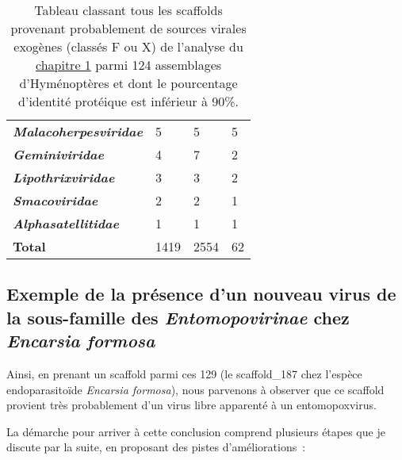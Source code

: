 \begin{table}[!htbp]
{\begin{tabular}{l|lll}
\textbf{\textit{Malacoherpesviridae}} & 5 & 5 & 5 \\
\textbf{\textit{Geminiviridae}} & 4 & 7 & 2 \\
\textbf{\textit{Lipothrixviridae}} & 3 & 3 & 2 \\
\textbf{\textit{Smacoviridae}} & 2 & 2 & 1 \\
\textbf{\textit{Alphasatellitidae}} & 1 & 1 & 1 \\
\textbf{Total} & 1419 & 2554 & 62 \\
\bottomrule
\end{tabular}
}
\caption[Perspective:Classification des scaffolds exogènes provenant du chapitre1]{Tableau classant tous les scaffolds provenant probablement de sources virales exogènes (classés F ou X) de l'analyse du \hyperref[sec:chap1]{chapitre 1} parmi 124 assemblages d'Hyménoptères et dont le pourcentage d'identité protéique est inférieur à 90\%.}
\label{table:Free-living_viruses}
\end{table}

\subsection{Exemple de la présence d'un nouveau virus de la sous-famille des \textit{Entomopovirinae} chez \textit{Encarsia formosa}}

Ainsi, en prenant un scaffold parmi ces 129 (le scaffold\_187 chez l'espèce endoparasitoïde \textit{Encarsia formosa}), nous parvenons à observer que ce scaffold provient très probablement d'un virus libre apparenté à un entomopoxvirus.

La démarche pour arriver à cette conclusion comprend plusieurs étapes que je discute par la suite, en proposant des pistes d'améliorations :

